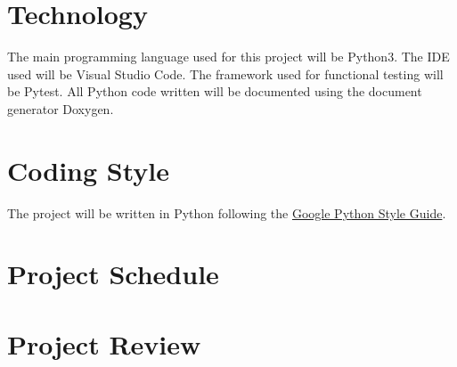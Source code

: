 \documentclass{article}
\begin{document}
\section{Technology}
The main programming language used for this project will be Python3. The IDE used will be Visual Studio Code. The framework used for functional testing will be Pytest. All Python code written will be documented using the document generator Doxygen.

\section{Coding Style}
The project will be written in Python following the \href{https://google.github.io/styleguide/pyguide.html}{Google Python Style Guide}.

\section{Project Schedule}

\section{Project Review}
\end{document}
